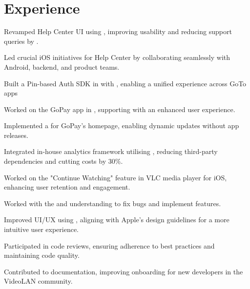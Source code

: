 \documentclass{fonts}
\begin{document}
%
%


\section{Experience}
\textbf{\href{https://www.gojek.io/}{}} 
\begin{tightemize}
    \item Revamped Help Center UI using , improving usability and reducing support queries by .
    \item Led crucial iOS initiatives for Help Center by collaborating seamlessly with Android, backend, and product teams.
    \item Built a Pin-based Auth SDK in  with , enabling a unified experience across GoTo apps
    \item Worked on the GoPay app in , supporting  with an enhanced user experience.
    \item Implemented a  for GoPay's homepage, enabling dynamic updates without app releases.
    \item Integrated in-house analytics framework utilising , reducing third-party dependencies and cutting costs by 30\%.
\end{tightemize}
\sectionsep

\textbf{\href{https://summerofcode.withgoogle.com/projects/6623823417311232}{}} 
\begin{tightemize}
    \item Worked on the "Continue Watching" feature in VLC media player for iOS, enhancing user retention and engagement.
    \item Worked with the  and understanding  to fix bugs and implement features.
    \item Improved UI/UX using , aligning with Apple's design guidelines for a more intuitive user experience.
    \item Participated in code reviews, ensuring adherence to best practices and maintaining code quality.
    \item Contributed to documentation, improving onboarding for new developers in the VideoLAN community.
\end{tightemize}
\end{document}
